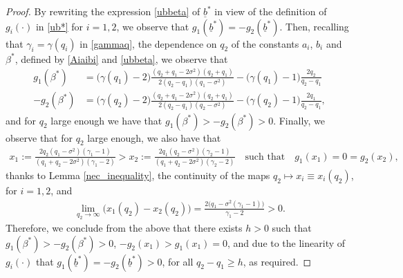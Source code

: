 \documentclass[11pt]{article} %
\def\ub{\underline{b}}
\numberwithin{komcounter}{section}
\begin{document}
\begin{proof}
By rewriting the expression \eqref{ubbeta} of $\ub^*$ in view of the definition of $g_i(\cdot)$ in \eqref{ub*} for $i=1,2$, we observe that 
$g_1(\ub^*) = - g_2(\ub^*)$. Then, recalling that $\gamma_i = \gamma(q_i)$ in \eqref{gammaq}, the dependence on $q_2$ of the constants $a_i$, $b_i$ and $\beta^*$, defined by \eqref{Aiaibi} and \eqref{ubbeta}, we observe that 
\begin{align*}
g_1(\beta^*) 
&= \big(\gamma(q_1) - 2 \big) \frac{(q_2 + q_1 - 2 \sigma^2) (q_2 + q_1)}{2 (q_2-q_1) (q_1 - \sigma^2)} - \big(\gamma(q_1) - 1 \big) \frac{2 q_2}{q_2-q_1} \\
-g_2(\beta^*) 
&= \big(\gamma(q_2) - 2 \big) \frac{(q_2+q_1-2\sigma^2) (q_2 + q_1)}{2 (q_2-q_1)(q_2 - \sigma^2)} - \big(\gamma(q_2) - 1 \big) \frac{2 q_1}{q_2-q_1},
\end{align*}
and for $q_2$ large enough we have that $g_1(\beta^*) > - g_2(\beta^*) > 0$. 
Finally, we observe that for $q_2$ large enough, we also have that  
\begin{align*} 
x_1 :=\frac{2q_2(q_1-\sigma^2)(\gamma_1-1)}{(q_1+q_2-2\sigma^2)(\gamma_1-2)} 
> x_2 :=\frac{2q_1(q_2-\sigma^2)(\gamma_2-1)}{(q_1+q_2-2\sigma^2)(\gamma_2-2)} 
\quad \text{such that} \quad 
g_1(x_1) = 0 = g_2(x_2),
\end{align*}
thanks to Lemma \ref{nec_inequality}, the continuity of the maps $q_2 \mapsto x_i \equiv x_i(q_2)$, for $i=1,2$, and  
\begin{align*}
\lim_{q_2 \to \infty} \big(x_1(q_2) - x_2(q_2)\big)
= \frac{2 \big(q_1 - \sigma^2(\gamma_1 - 1)\big)}{\gamma_1 - 2} > 0. 
\end{align*}
Therefore, we conclude from the above that there exists $h>0$ such that $g_1(\beta^*) > - g_2(\beta^*) > 0$, $- g_2(x_1) > g_1(x_1) = 0$, and due to the linearity of $g_i(\cdot)$ that $g_1(\ub^*) = - g_2(\ub^*) > 0$, for all $q_2-q_1\geq h$, as required. 

 


\end{proof}
\end{document}
